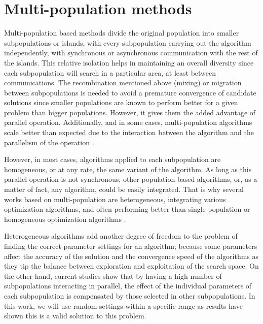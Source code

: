 \documentclass[review]{elsarticle}
\begin{document}
\section{Multi-population methods} %
\label{multi}

Multi-population based methods divide the original population into
smaller subpopulations or islands, with every subpopulation carrying out the
algorithm independently, with synchronous or asynchronous communication with the
rest of the islands. %
This relative isolation helps in maintaining an overall
diversity since each subpopulation will search in a particular area, at least
between communications. The recombination mentioned above (mixing) or migration
between subpopulations is needed to avoid a premature convergence of candidate
solutions since smaller populations are known to perform better for a given
problem than bigger populations. %
However, it gives them the added advantage of
parallel operation. Additionally, and in some cases, multi-population algorithms
scale better than expected due to the interaction between the algorithm and the
parallelism of the operation \cite{ALBA20027}. %

However, in most cases, algorithms applied to each subpopulation are
homogeneous, or at any rate, the same variant of the algorithm. As long as this
parallel operation is not synchronous, other population-based algorithms, or, as
a matter of fact, any algorithm, could be easily integrated. That is why several
works based on multi-population are heterogeneous, integrating various
optimization algorithms, and often performing better than single-population or
homogeneous optimization algorithms \cite{wu2016differential,nseef2016adaptive}.

Heterogeneous algorithms add another degree of freedom to the problem of finding
the correct parameter settings for an algorithm; because some parameters affect
the accuracy of the solution and the convergence speed of the algorithms as they
tip the balance between exploration and exploitation of the search space. On the
other hand, current studies show that by having a high number of subpopulations
interacting in parallel, the effect of the individual parameters of each
subpopulation is compensated by those selected in other
subpopulations. %
In this
work, we will use random settings within a specific range as results have shown
this is a valid solution to this problem. %
\end{document}

